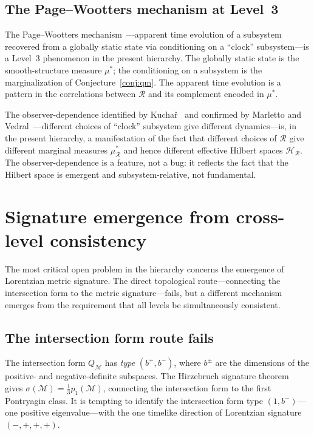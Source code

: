 \documentclass[12pt,a4paper]{article}
\theoremstyle{definition}
\theoremstyle{remark}
\begin{document}
\subsection{The Page--Wootters mechanism at Level~3}

The Page--Wootters mechanism~\cite{page_wootters}---apparent time evolution
of a subsystem recovered from a globally static state via conditioning on a
``clock'' subsystem---is a Level~3 phenomenon in the present hierarchy. The
globally static state is the smooth-structure measure $\mu^*$; the
conditioning on a subsystem is the marginalization of Conjecture~\ref{conj:qm}.
The apparent time evolution is a pattern in the correlations between
$\mathcal{R}$ and its complement encoded in $\mu^*$.

The observer-dependence identified by Kucha\v{r}~\cite{kuchar} and confirmed
by Marletto and Vedral~\cite{marletto_vedral}---different choices of ``clock''
subsystem give different dynamics---is, in the present hierarchy, a manifestation
of the fact that different choices of $\mathcal{R}$ give different marginal
measures $\mu^*_\mathcal{R}$ and hence different effective Hilbert spaces
$\mathcal{H}_\mathcal{R}$. The observer-dependence is a feature, not a bug:
it reflects the fact that the Hilbert space is emergent and subsystem-relative,
not fundamental.

\section{Signature emergence from cross-level consistency}
\label{sec:signature}

The most critical open problem in the hierarchy concerns the emergence of
Lorentzian metric signature. The direct topological route---connecting the
intersection form to the metric signature---fails, but a different mechanism
emerges from the requirement that all levels be simultaneously consistent.

\subsection{The intersection form route fails}

The intersection form $Q_\mathcal{M}$ has \emph{type} $(b^+, b^-)$, where
$b^\pm$ are the dimensions of the positive- and negative-definite subspaces.
The Hirzebruch signature theorem~\cite{hirzebruch} gives $\sigma(\mathcal{M}) =
\frac{1}{3}p_1(\mathcal{M})$, connecting the intersection form to the first
Pontryagin class. It is tempting to identify the intersection form type
$(1, b^-)$---one positive eigenvalue---with the one timelike direction of
Lorentzian signature $(-,+,+,+)$.
\end{document}
